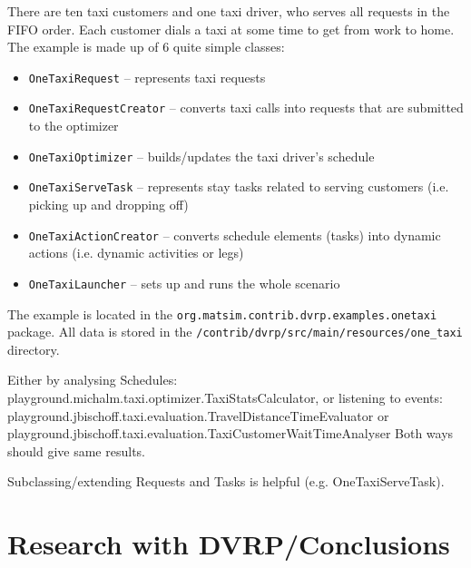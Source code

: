 There are ten taxi customers and one taxi driver, who serves all requests in the FIFO order. Each customer dials a taxi at some time to get from work to home. The example is made up of 6 quite simple classes:
%
\begin{itemize}
	\item \lstinline$OneTaxiRequest$ -- represents taxi requests
	
	\item \lstinline$OneTaxiRequestCreator$ -- converts taxi calls into requests that are submitted to the optimizer
	
	\item \lstinline$OneTaxiOptimizer$ -- builds/updates the taxi driver's schedule
	
	\item \lstinline$OneTaxiServeTask$ -- represents stay tasks related to serving customers (i.e. picking up and dropping off)
	
	\item \lstinline$OneTaxiActionCreator$ -- converts schedule elements (tasks) into dynamic actions (i.e. dynamic activities or legs)
	
	\item \lstinline$OneTaxiLauncher$ -- sets up and runs the whole scenario
\end{itemize}

The example is located in the \lstinline$org.matsim.contrib.dvrp.examples.onetaxi$ package. All data is stored in the \lstinline$/contrib/dvrp/src/main/resources/one_taxi$ directory.







Either by analysing Schedules: playground.michalm.taxi.optimizer.TaxiStatsCalculator, or listening to events: playground.jbischoff.taxi.evaluation.TravelDistanceTimeEvaluator or playground.jbischoff.taxi.evaluation.TaxiCustomerWaitTimeAnalyser 
Both ways should give same results.

Subclassing/extending Requests and Tasks is helpful (e.g. OneTaxiServeTask).


\section{Research with DVRP/Conclusions}

